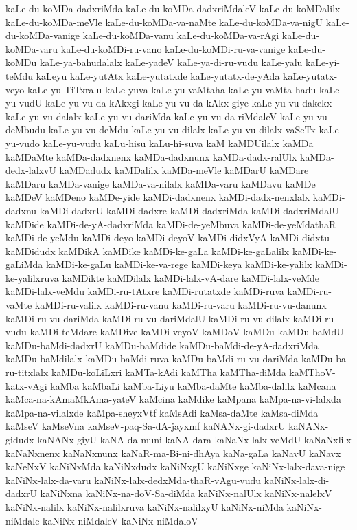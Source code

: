 {kaLe-du-koMDa-dadxriMda
kaLe-du-koMDa-dadxriMdaleV
kaLe-du-koMDalilx
kaLe-du-koMDa-meVle
kaLe-du-koMDa-va-naMte
kaLe-du-koMDa-va-nigU
kaLe-du-koMDa-vanige
kaLe-du-koMDa-vanu
kaLe-du-koMDa-va-rAgi
kaLe-du-koMDa-varu
kaLe-du-koMDi-ru-vano
kaLe-du-koMDi-ru-va-vanige
kaLe-du-koMDu
kaLe-ya-bahudalalx
kaLe-yadeV
kaLe-ya-di-ru-vudu
kaLe-yalu
kaLe-yi-teMdu
kaLeyu
kaLe-yutAtx
kaLe-yutatxde
kaLe-yutatx-de-yAda
kaLe-yutatx-veyo
kaLe-yu-TiTxralu
kaLe-yuva
kaLe-yu-vaMtaha
kaLe-yu-vaMta-hadu
kaLe-yu-vudU
kaLe-yu-vu-da-kAkxgi
kaLe-yu-vu-da-kAkx-giye
kaLe-yu-vu-dakekx
kaLe-yu-vu-dalalx
kaLe-yu-vu-dariMda
kaLe-yu-vu-da-riMdaleV
kaLe-yu-vu-deMbudu
kaLe-yu-vu-deMdu
kaLe-yu-vu-dilalx
kaLe-yu-vu-dilalx-vaSeTx
kaLe-yu-vudo
kaLe-yu-vudu
kaLu-hisu
kaLu-hi-suva
kaM
kaMDUilalx
kaMDa
kaMDaMte
kaMDa-dadxnenx
kaMDa-dadxnunx
kaMDa-dadx-ralUlx
kaMDa-dedx-lalxvU
kaMDadudx
kaMDalilx
kaMDa-meVle
kaMDarU
kaMDare
kaMDaru
kaMDa-vanige
kaMDa-va-nilalx
kaMDa-varu
kaMDavu
kaMDe
kaMDeV
kaMDeno
kaMDe-yide
kaMDi-dadxnenx
kaMDi-dadx-nenxlalx
kaMDi-dadxnu
kaMDi-dadxrU
kaMDi-dadxre
kaMDi-dadxriMda
kaMDi-dadxriMdalU
kaMDide
kaMDi-de-yA-dadxriMda
kaMDi-de-yeMbuva
kaMDi-de-yeMdathaR
kaMDi-de-yeMdu
kaMDi-deyo
kaMDi-deyoV
kaMDi-didxVyA
kaMDi-didxtu
kaMDidudx
kaMDikA
kaMDike
kaMDi-ke-gaLa
kaMDi-ke-gaLalilx
kaMDi-ke-gaLiMda
kaMDi-ke-gaLu
kaMDi-ke-va-rege
kaMDi-keya
kaMDi-ke-yalilx
kaMDi-ke-yalilxruva
kaMDikte
kaMDilalx
kaMDi-lalx-vA-dare
kaMDi-lalx-veMde
kaMDi-lalx-veMdu
kaMDi-ru-tAtxre
kaMDi-rutatxde
kaMDi-ruva
kaMDi-ru-vaMte
kaMDi-ru-valilx
kaMDi-ru-vanu
kaMDi-ru-varu
kaMDi-ru-vu-danunx
kaMDi-ru-vu-dariMda
kaMDi-ru-vu-dariMdalU
kaMDi-ru-vu-dilalx
kaMDi-ru-vudu
kaMDi-teMdare
kaMDive
kaMDi-veyoV
kaMDoV
kaMDu
kaMDu-baMdU
kaMDu-baMdi-dadxrU
kaMDu-baMdide
kaMDu-baMdi-de-yA-dadxriMda
kaMDu-baMdilalx
kaMDu-baMdi-ruva
kaMDu-baMdi-ru-vu-dariMda
kaMDu-ba-ru-titxlalx
kaMDu-koLiLxri
kaMTa-kAdi
kaMTha
kaMTha-diMda
kaMThoV-katx-vAgi
kaMba
kaMbaLi
kaMba-Liyu
kaMba-daMte
kaMba-dalilx
kaMcana
kaMca-na-kAmaMkAma-yateV
kaMcina
kaMdike
kaMpana
kaMpa-na-vi-lalxda
kaMpa-na-vilalxde
kaMpa-sheyxVtf
kaMsAdi
kaMsa-daMte
kaMsa-diMda
kaMseV
kaMseVna
kaMseV-paq-Sa-dA-jayxmf
kaNANx-gi-dadxrU
kaNANx-gidudx
kaNANx-giyU
kaNA-da-muni
kaNA-dara
kaNaNx-lalx-veMdU
kaNaNxlilx
kaNaNxnenx
kaNaNxnunx
kaNaR-ma-Bi-ni-dhAya
kaNa-gaLa
kaNavU
kaNavx
kaNeNxV
kaNiNxMda
kaNiNxdudx
kaNiNxgU
kaNiNxge
kaNiNx-lalx-dava-nige
kaNiNx-lalx-da-varu
kaNiNx-lalx-dedxMda-thaR-vAgu-vudu
kaNiNx-lalx-di-dadxrU
kaNiNxna
kaNiNx-na-doV-Sa-diMda
kaNiNx-nalUlx
kaNiNx-nalelxV
kaNiNx-nalilx
kaNiNx-nalilxruva
kaNiNx-nalilxyU
kaNiNx-niMda
kaNiNx-niMdale
kaNiNx-niMdaleV
kaNiNx-niMdaloV
}

